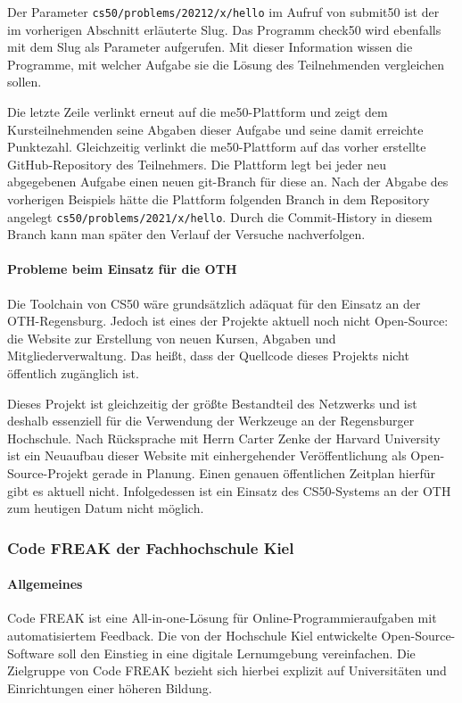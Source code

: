 Der Parameter \texttt{cs50/problems/20212/x/hello} im Aufruf von submit50 ist
der im vorherigen Abschnitt erläuterte Slug. Das Programm check50 wird ebenfalls
mit dem Slug als Parameter aufgerufen. Mit dieser Information wissen die
Programme, mit welcher Aufgabe sie die Lösung des Teilnehmenden vergleichen
sollen.

Die letzte Zeile verlinkt erneut auf die me50-Plattform und zeigt dem
Kursteilnehmenden seine Abgaben dieser Aufgabe und seine damit erreichte
Punktezahl. Gleichzeitig verlinkt die me50-Plattform auf das vorher erstellte
GitHub-Repository des Teilnehmers. Die Plattform legt bei jeder neu abgegebenen
Aufgabe einen neuen git-Branch für diese an. Nach der Abgabe des vorherigen
Beispiels hätte die Plattform folgenden Branch in dem Repository angelegt
\texttt{cs50/problems/2021/x/hello}. Durch die Commit-History in diesem Branch 
kann man später den Verlauf der Versuche nachverfolgen.

\paragraph{Probleme beim Einsatz für die OTH}
Die Toolchain von CS50 wäre grundsätzlich adäquat für den Einsatz an der
OTH-Regensburg. Jedoch ist eines der Projekte aktuell noch nicht Open-Source:
die Website zur Erstellung von neuen Kursen, Abgaben und Mitgliederverwaltung. 
Das heißt, dass der Quellcode dieses Projekts nicht öffentlich zugänglich ist.

Dieses Projekt ist gleichzeitig der größte Bestandteil des Netzwerks und ist
deshalb essenziell für die Verwendung der Werkzeuge an der Regensburger
Hochschule. Nach Rücksprache mit Herrn Carter Zenke der Harvard University ist
ein Neuaufbau dieser Website mit einhergehender Veröffentlichung als
Open-Source-Projekt gerade in Planung. Einen genauen öffentlichen Zeitplan
hierfür gibt es aktuell nicht. Infolgedessen ist ein Einsatz des CS50-Systems an
der OTH zum heutigen Datum nicht möglich.

\newpage
\subsubsection{Code FREAK der Fachhochschule Kiel}\label{code-freak}
\paragraph{Allgemeines}
Code FREAK ist eine All-in-one-Lösung für Online-Programmieraufgaben mit
automatisiertem Feedback. Die von der Hochschule Kiel entwickelte
Open-Source-Software soll den Einstieg in eine digitale Lernumgebung
vereinfachen. Die Zielgruppe von Code FREAK bezieht sich hierbei explizit auf
Universitäten und Einrichtungen einer höheren Bildung.
\parencite{codefreak-startseite}

